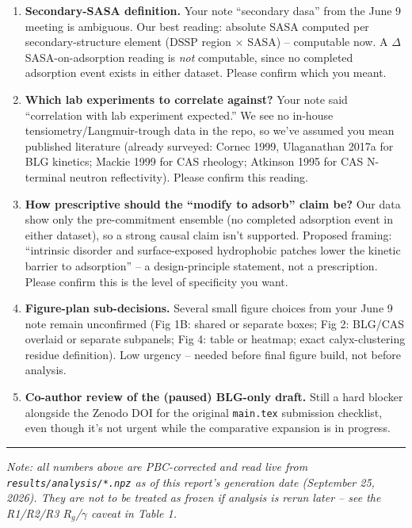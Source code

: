 \documentclass[11pt]{article}
\begin{document}
\begin{enumerate}[itemsep=4pt]
  \item \textbf{Secondary-SASA definition.} Your note ``secondary dasa'' from the June
    9 meeting is ambiguous. Our best reading: absolute SASA computed per
    secondary-structure element (DSSP region $\times$ SASA) -- computable now. A
    $\Delta$SASA-on-adsorption reading is \emph{not} computable, since no completed
    adsorption event exists in either dataset. Please confirm which you meant.
  \item \textbf{Which lab experiments to correlate against?} Your note said
    ``correlation with lab experiment expected.'' We see no in-house
    tensiometry/Langmuir-trough data in the repo, so we've assumed you mean published
    literature (already surveyed: Cornec 1999, Ulaganathan 2017a for BLG kinetics;
    Mackie 1999 for CAS rheology; Atkinson 1995 for CAS N-terminal neutron
    reflectivity). Please confirm this reading.
  \item \textbf{How prescriptive should the ``modify to adsorb'' claim be?} Our data
    show only the pre-commitment ensemble (no completed adsorption event in either
    dataset), so a strong causal claim isn't supported. Proposed framing: ``intrinsic
    disorder and surface-exposed hydrophobic patches lower the kinetic barrier to
    adsorption'' -- a design-principle statement, not a prescription. Please confirm
    this is the level of specificity you want.
  \item \textbf{Figure-plan sub-decisions.} Several small figure choices from your
    June 9 note remain unconfirmed (Fig 1B: shared or separate boxes; Fig 2: BLG/CAS
    overlaid or separate subpanels; Fig 4: table or heatmap; exact calyx-clustering
    residue definition). Low urgency -- needed before final figure build, not before
    analysis.
  \item \textbf{Co-author review of the (paused) BLG-only draft.} Still a hard
    blocker alongside the Zenodo DOI for the original \texttt{main.tex} submission
    checklist, even though it's not urgent while the comparative expansion is in
    progress.
\end{enumerate}

\vspace{1em}
\noindent\rule{\textwidth}{0.4pt}
\small
\textit{Note: all numbers above are PBC-corrected and read live from
\texttt{results/analysis/*.npz} as of this report's generation date
(September 25, 2026). They are not to be treated as frozen if analysis is rerun
later -- see the R1/R2/R3 $R_g$/$\gamma$ caveat in Table 1.}
\end{document}
